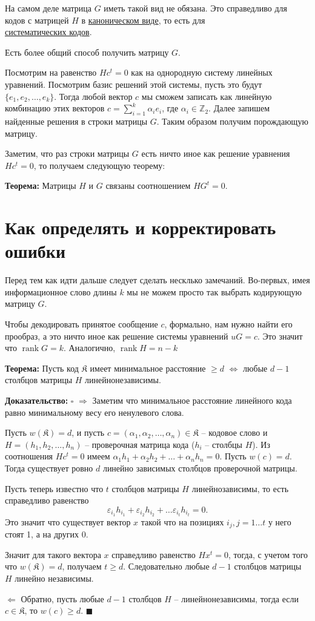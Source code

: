 \documentclass{article}
\newcommand{\THRM}[1] {
    \textbf{Теорема: } #1
}
\newcommand{\PROOF}[1] {
    \textbf{Доказательство: } $\square$ #1 $\blacksquare$
}
\newcommand{\eps}{\varepsilon}
\DeclareMathOperator{\rank}{rank}
\begin{document}
    На самом деле матрица $G$ иметь такой вид не обязана. Это справедливо для кодов с матрицей $H$ в \underline{ каноническом виде}, то есть для \\ 
    \underline{систематических кодов}.
    
    Есть более общий способ получить матрицу $G$. 

    Посмотрим на равенство $Hc^t = 0$ как на однородную систему линейных уравнений. Посмотрим базис решений этой системы, пусть это будут $\{e_1, e_2, \dots , e_k\}$.
    Тогда любой вектор $c$ мы сможем записать как линейную комбинацию этих векторов $c = \sum_{i = 1}^k \alpha_i e_i$, где $\alpha_i \in \mathbb{Z}_2$. Далее запишем
    найденные решения в строки матрицы $G$. Таким образом получим порождающую матрицу.

    Заметим, что раз строки матрицы $G$ есть ничто иное как решение уравнения $Hc^t = 0$, то получаем следующую теорему:

    \THRM{Матрицы $H$ и $G$ связаны соотношением $HG^t = 0$.}

    \section{Как определять и корректировать ошибки}

    Перед тем как идти дальше следует сделать несклько замечаний. Во-первых, имея информационное слово длины $k$ мы не можем просто так выбрать кодирующую матрицу $G$. 
    
    Чтобы декодировать принятое сообщение $c$, формально, нам нужно найти его прообраз, а это ничто иное как решение системы уравнений $uG = c$. 
    Это значит что $\rank G = k$. Аналогично, $\rank H = n - k$

    \THRM{Пусть код $\mathfrak{K}$ имеет минимальное расстояние $\ge d$ $\Leftrightarrow$ любые $d - 1$ столбцов матрицы $H$ линейнонезависимы.}

    \PROOF{
        $\Rightarrow$ Заметим что минимальное расстояние линейного кода равно минимальному весу его ненулевого слова.

        Пусть $w(\mathfrak{K}) = d$, и пусть $c = (\alpha_1, \alpha_2, \dots , \alpha_n) \in \mathfrak{K}$ -- кодовое слово 
        и $H = (h_1, h_2, \dots , h_n)$ -- проверочная матрица кода ($h_i$ -- столбцы $H$). Из соотношения $Hc^t = 0$ имеем
        $\alpha_1 h_1 + \alpha_2 h_2 + \dots + \alpha_n h_n = 0$. Пусть $w(c) = d$. Тогда существует ровно $d$ линейно зависимых
        столбцов проверочной матрицы.

        Пусть теперь известно что $t$ столбцов матрицы $H$ линейнозависимы, то есть справедливо равенство
        $$ \eps_{i_1} h_{i_1} + \eps_{i_2} h_{i_2} + \dots \eps_{i_t} h_{i_t} = 0. $$
        Это значит что существует вектор $x$ такой что на позициях $i_j, j = 1\dots t$ у него стоят 1, а на других 0.

        Значит для такого вектора $x$ справедливо равенство $Hx^t = 0$, тогда, с учетом того что $w(\mathfrak{K}) = d$, получаем $t \ge d$.
        Следовательно любые $d - 1$ столбцов матрицы $H$ линейно независимы.

        $\Leftarrow$ Обратно, пусть любые $d - 1$ столбцов $H$ -- линейнонезависимы, тогда если $c \in \mathfrak{K}$, то $w(c) \ge d$.
    }
\end{document}

